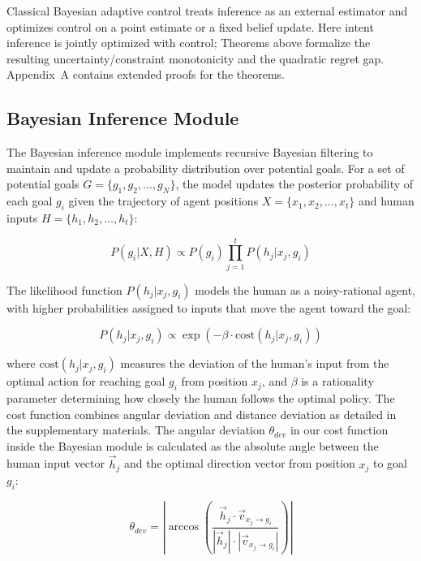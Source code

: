 \documentclass[11pt]{article}
\begin{document}
Classical Bayesian adaptive control treats inference as an external estimator and optimizes control on a point estimate or a fixed belief update. Here  intent inference is jointly optimized with control; Theorems above formalize the resulting uncertainty/constraint monotonicity and the quadratic regret gap. Appendix~A contains extended proofs for the theorems. 



\subsection{Bayesian Inference Module}

The Bayesian inference module implements recursive Bayesian filtering to maintain and update a probability distribution over potential goals. For a set of potential goals $G = \{g_1, g_2, ..., g_N\}$, the model updates the posterior probability of each goal $g_i$ given the trajectory of agent positions $X = \{x_1, x_2, ..., x_t\}$ and human inputs $H = \{h_1, h_2, ..., h_t\}$:

\begin{equation}
P(g_i|X,H) \propto P(g_i) \prod_{j=1}^{t} P(h_j|x_j,g_i)
\end{equation}

The likelihood function $P(h_j|x_j,g_i)$ models the human as a noisy-rational agent, with higher probabilities assigned to inputs that move the agent toward the goal:

\begin{equation}
P(h_j|x_j,g_i) \propto \exp(-\beta \cdot \text{cost}(h_j|x_j,g_i))
\end{equation}

where $\text{cost}(h_j|x_j,g_i)$ measures the deviation of the human's input from the optimal action for reaching goal $g_i$ from position $x_j$, and $\beta$ is a rationality parameter determining how closely the human follows the optimal policy. The cost function combines angular deviation and distance deviation as detailed in the supplementary materials.
The angular deviation $\theta_{dev}$ in our cost function inside the Bayesian module is calculated as the absolute angle between the human input vector $\vec{h}_j$ and the optimal direction vector from position $x_j$ to goal $g_i$:

\begin{equation}
\theta_{dev} = \left|\arccos\left(\frac{\vec{h}_j \cdot \vec{v}_{x_j\rightarrow g_i}}{|\vec{h}_j|\cdot|\vec{v}_{x_j\rightarrow g_i}|}\right)\right|
\end{equation}
\end{document}
